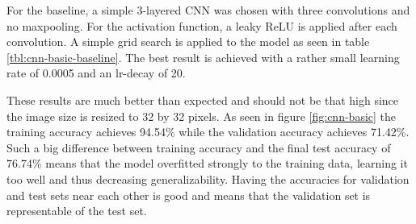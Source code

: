 For the baseline, a simple 3-layered CNN was chosen with three convolutions and no maxpooling. For the activation function, a leaky ReLU is applied after each convolution. A simple grid search is applied to the model as seen in table \ref{tbl:cnn-basic-baseline}. The best result is achieved with a rather small learning rate of 0.0005 and an lr-decay of 20.

\begin{table}[h]
    \caption{Accuracy (\%) for several learning rates and lr-decays for CNN\_Basic as a baseline.}
    \centering
    \begin{small}
    \textsc{
    }
    \end{small}
    \vspace{-3.9mm}
    \label{tbl:cnn-basic-baseline}
\end{table}

\quad


These results are much better than expected and should not be that high since the image size is resized to 32 by 32 pixels. As seen in figure \ref{fig:cnn-basic} the training accuracy achieves 94.54\% while the validation accuracy achieves 71.42\%. Such a big difference between training accuracy and the final test accuracy of 76.74\% means that the model overfitted strongly to the training data, learning it too well and thus decreasing generalizability. Having the accuracies for validation and test sets near each other is good and means that the validation set is representable of the test set.

